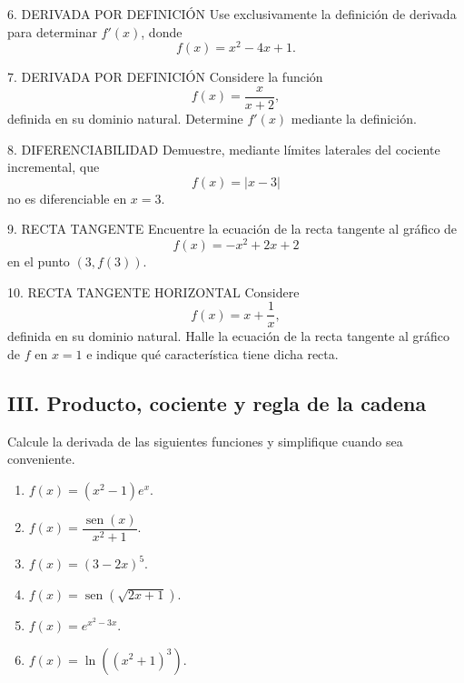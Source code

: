\documentclass[letterpaper,12pt]{article}
\newcommand{\sen}{\operatorname{sen}}
\newcommand{\tituloSeccion}[1]{%
    \needspace{4\baselineskip}
    \subsection*{\color{azulFuerte}#1}
}
\begin{document}
\begin{controlbox}{6. DERIVADA POR DEFINICIÓN}
Use exclusivamente la definición de derivada para determinar \(f'(x)\), donde
\[
f(x)=x^2-4x+1.
\]
\end{controlbox}

\begin{controlbox}{7. DERIVADA POR DEFINICIÓN}
Considere la función
\[
f(x)=\frac{x}{x+2},
\]
definida en su dominio natural. Determine \(f'(x)\) mediante la definición.
\end{controlbox}

\begin{controlbox}{8. DIFERENCIABILIDAD}
Demuestre, mediante límites laterales del cociente incremental, que
\[
f(x)=|x-3|
\]
no es diferenciable en \(x=3\).
\end{controlbox}

\begin{controlbox}{9. RECTA TANGENTE}
Encuentre la ecuación de la recta tangente al gráfico de
\[
f(x)=-x^2+2x+2
\]
en el punto \((3,f(3))\).
\end{controlbox}

\begin{controlbox}{10. RECTA TANGENTE HORIZONTAL}
Considere
\[
f(x)=x+\frac{1}{x},
\]
definida en su dominio natural. Halle la ecuación de la recta tangente al gráfico de \(f\) en \(x=1\) e indique qué característica tiene dicha recta.
\end{controlbox}

\tituloSeccion{III. Producto, cociente y regla de la cadena}
\noindent Calcule la derivada de las siguientes funciones y simplifique cuando sea conveniente.

\begin{enumerate}[label=\color{azulFuerte}\textbf{\arabic*.},leftmargin=*,start=11,itemsep=1em]
    \item \(f(x)=(x^2-1)e^x.\)

    \item \(f(x)=\dfrac{\sen(x)}{x^2+1}.\)

    \item \(f(x)=(3-2x)^5.\)

    \item \(f(x)=\sen\!\left(\sqrt{2x+1}\right).\)

    \item \(f(x)=e^{x^2-3x}.\)

    \item \(f(x)=\ln\!\left((x^2+1)^3\right).\)
\end{enumerate}
\end{document}
